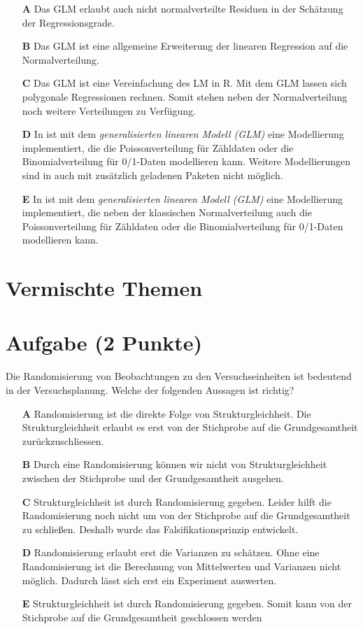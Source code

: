\documentclass[a4paper, 9pt]{scrartcl}\usepackage[]{graphicx}\usepackage[]{xcolor}
\begin{document}
\begin{enumerate}
\item [\textbf{A} \msquare] Das GLM erlaubt auch nicht normalverteilte Residuen in der Schätzung der Regressionsgrade.
\item [\textbf{B} \msquare] Das GLM ist eine allgemeine Erweiterung der linearen Regression auf die Normalverteilung.
\item [\textbf{C} \msquare] Das GLM ist eine Vereinfachung des LM in R. Mit dem GLM lassen sich polygonale Regressionen rechnen. Somit stehen neben der Normalverteilung noch weitere Verteilungen zu Verfügung.
\item [\textbf{D} \msquare] In \Rlogo ist mit dem \textit{generalisierten linearen Modell (GLM)} eine Modellierung implementiert, die die Poissonverteilung für Zähldaten oder die Binomialverteilung für 0/1-Daten modellieren kann. Weitere Modellierungen sind in \Rlogo auch mit zusätzlich geladenen Paketen nicht möglich.
\item [\textbf{E} \msquare] In \Rlogo ist mit dem \textit{generalisierten linearen Modell (GLM)} eine Modellierung implementiert, die neben der klassischen Normalverteilung auch die Poissonverteilung für Zähldaten oder die Binomialverteilung für 0/1-Daten modellieren kann.
\end{enumerate}
\section*{Vermischte Themen}  

\section{Aufgabe \hfill (2 Punkte)}

Die Randomisierung von Beobachtungen zu den Versuchseinheiten
ist bedeutend in der Versuchsplanung. Welche der folgenden Aussagen ist richtig?



\begin{enumerate}
\item [\textbf{A} \msquare] Randomisierung ist die direkte Folge von Strukturgleichheit. Die Strukturgleichheit erlaubt es erst von der Stichprobe auf die Grundgesamtheit zurückzuschliessen.
\item [\textbf{B} \msquare] Durch eine Randomisierung können wir nicht von Strukturgleichheit zwischen der Stichprobe und der Grundgesamtheit ausgehen.
\item [\textbf{C} \msquare] Strukturgleichheit ist durch Randomisierung gegeben. Leider hilft die Randomisierung noch nicht um von der Stichprobe auf die Grundgesamtheit zu schließen. Deshalb wurde das Falsifikationsprinzip entwickelt.
\item [\textbf{D} \msquare] Randomisierung erlaubt erst die Varianzen zu schätzen. Ohne eine Randomisierung ist die Berechnung von Mittelwerten und Varianzen nicht möglich. Dadurch lässt sich erst ein Experiment auswerten.
\item [\textbf{E} \msquare] Strukturgleichheit ist durch Randomisierung gegeben. Somit kann von der Stichprobe auf die Grundgesamtheit geschlossen werden
\end{enumerate}
\end{document}
